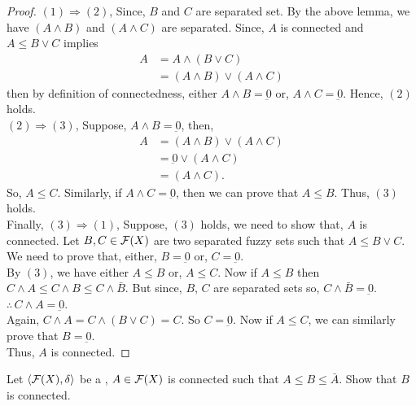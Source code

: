 \documentclass[../main-sheet.tex]{subfiles}
\begin{document}
\begin{proof}
    \((1)\Rightarrow(2)\), Since, \(B\) and \(C\) are separated set. By the above lemma, we have \((A\wedge B)\) and \((A\wedge C)\) are separated. Since, \(A\) is connected and \(A\leq B\vee C\) implies
    \begin{align*}
        A&=A\wedge (B\vee C)\\
        &=(A\wedge B)\vee(A\wedge C)
    \end{align*}
    then by definition of connectedness, either \(A\wedge B=\underbar{0}\) or, \(A\wedge C=\underbar{0}\). Hence, \((2)\) holds.\\

    \((2)\Rightarrow(3)\), Suppose, \(A\wedge B=\underbar{0}\), then,
    \begin{align*}
        A&=(A\wedge B)\vee (A\wedge C)\\
        &=\underbar{0} \vee (A\wedge C)\\
        &=(A\wedge C).
    \end{align*}
    So, \(A\leq C\). Similarly, if \(A\wedge C=\underbar{0}\), then we can prove that \(A\leq B\). Thus, \((3)\) holds.\\

    Finally, \((3)\Rightarrow(1)\), Suppose, \((3)\) holds, we need to show that, \(A\) is connected. Let \(B,C\in\mathcal{F}(X)\) are two separated fuzzy sets such that \(A\leq B\vee C\). We need to prove that, either, \(B=\underbar{0}\) or, \(C=\underbar{0}\).\\
    By \((3)\), we have either \(A\leq B\) or, \(A\leq C\). Now if \(A\leq B\) then \(C\wedge A\leq C\wedge B\leq C\wedge\bar{B}\). But since, \(B\), \(C \) are separated sets so, \(C\wedge \bar{B }=\underbar{0}\). \(\therefore\,C\wedge A=\underbar{0}\).\\
    Again, \(C\wedge A=C\wedge(B\vee C)=C\). So \(C=\underbar{0}\). Now if \(A\leq C \), we can similarly prove that \(B=\underbar{0}\).\\
    Thus, \(A \) is connected.
\end{proof}
\newpage
\begin{thm}
    Let \(\langle \mathcal{F}(X), \delta \rangle\) be a \fts, \(A\in\mathcal{F}(X)\) is connected such that \(A\leq B\leq\bar{A}\). Show that \(B \) is connected.
\end{thm}
\end{document}
